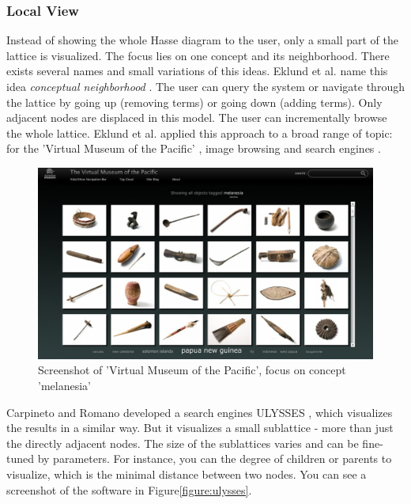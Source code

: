 \documentclass[11pt]{report}
\begin{document}
\subsubsection{Local View}

Instead of showing the whole Hasse diagram to the user, only a small part of the lattice is visualized. The focus lies on one concept and its neighborhood. There exists several names and small variations of this ideas. Eklund et al. name this idea \textit{conceptual neighborhood} \cite{Eklund2009,Eklund2012}. The user can query the system or navigate through the lattice by going up (removing terms) or going down (adding terms). Only adjacent nodes are displaced in this model. The user can incrementally browse the whole lattice. Eklund et al. applied this approach to a broad range of topic: for the 'Virtual Museum of the Pacific' \cite{Eklund2009,Eklund2012}, image browsing \cite{Ducrou2006,Ducrou2008} and search engines \cite{Dau2008}.

\begin{figure}[h]
\label{figure:pacific}
	\centering
	\includegraphics[width=\linewidth]{images/pacific}
\caption{Screenshot of 'Virtual Museum of the Pacific', focus on concept 'melanesia'}
\end{figure}

Carpineto and Romano developed a search engines ULYSSES \cite{Carpineto1995,Carpineto1996}, which visualizes the results in a similar way. But it visualizes a small sublattice - more than just the directly adjacent nodes. The size of the sublattices varies and can be fine-tuned by parameters. For instance, you can the degree of children or parents to visualize, which is the minimal distance between two nodes. You can see a screenshot of the software in Figure\ref{figure:ulysses}.
\end{document}
